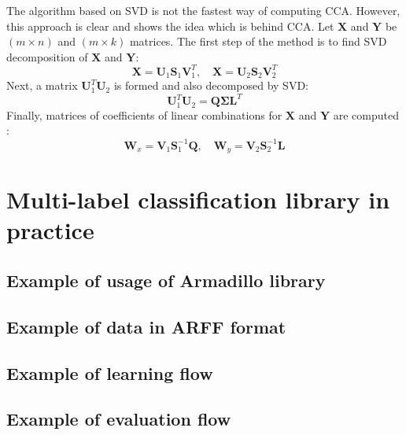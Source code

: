 \begin{appendices}
The algorithm based on SVD is not the fastest way of computing CCA. However, this approach is clear and shows the idea which is behind CCA. Let $\boldsymbol{X}$ and $\boldsymbol{Y}$ be $(m \times n)$ and $(m \times k)$ matrices. The first step of the method is to find SVD decomposition of $\boldsymbol{X}$ and $\boldsymbol{Y}$:
\begin{equation}
    \boldsymbol{X}=\boldsymbol{U}_1\boldsymbol{S}_1\boldsymbol{V}^T_1, \quad \boldsymbol{X}=\boldsymbol{U}_2\boldsymbol{S}_2\boldsymbol{V}^T_2
\end{equation}
Next, a matrix $\boldsymbol{U}_1^T\boldsymbol{U}_2$ is formed and also decomposed by SVD:
\begin{equation}
    \boldsymbol{U}_1^T\boldsymbol{U}_2 = \boldsymbol{Q}\boldsymbol{\Sigma}{\boldsymbol{L}^T}
\end{equation}
Finally, matrices of coefficients of linear combinations for $\boldsymbol{X}$ and $\boldsymbol{Y}$ are computed \citep{William}:
\begin{equation}
    \boldsymbol{W}_x=\boldsymbol{V}_1\boldsymbol{S}_1^{-1}\boldsymbol{Q}, \quad  \boldsymbol{W}_y=\boldsymbol{V}_2\boldsymbol{S}_2^{-1}\boldsymbol{L}
\end{equation}


\chapter{Multi-label classification library in practice}
\section{Example of usage of Armadillo library}
\label{app:arma}


\newpage
\section{Example of data in ARFF format}
\label{app:arff}



\newpage
\section{Example of learning flow}
\label{app:learning}


\newpage
\section{Example of evaluation flow}
\label{app:evaluating}


\end{appendices}

